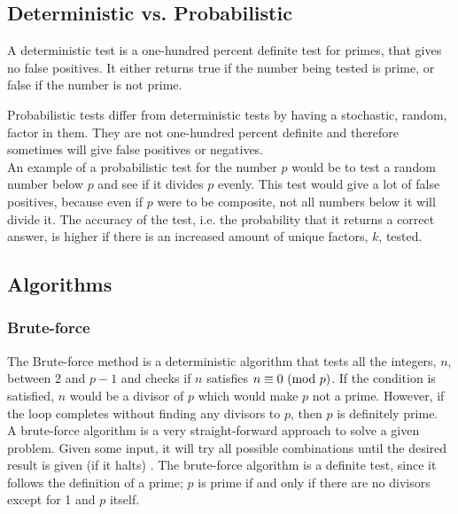 \documentclass[main.tex]{subfiles}
\begin{document}
\subsection{Deterministic vs. Probabilistic}
A deterministic test is a one-hundred percent definite test for primes, that
gives no false positives. It either returns true if the number being tested is
prime, or false if the number is not prime. \newline

Probabilistic tests differ from deterministic tests by having a stochastic,
random, factor in them. They are not one-hundred percent definite and therefore
sometimes will give false positives or negatives. \\

An example of a probabilistic test for the number $p$ would be to test a random
number below $p$ and see if it divides $p$ evenly. This test would give a lot of
false positives, because even if $p$ were to be composite, not all numbers below
it will divide it. The accuracy of the test, i.e. the probability that it
returns a correct answer, is higher if there is an increased amount of unique
factors, $k$, tested.

\subsection{Algorithms}

\subsubsection{Brute-force} \label{brute}

The Brute-force method is a deterministic algorithm that tests all the integers,
$n$, between $2$ and $p-1$ and checks if $n$ satisfies $n \equiv 0 \ (\mathrm{mod}\ p)$. If
the condition is satisfied, $n$ would be a divisor of $p$ which would make $p$
not a prime. However, if the loop completes without finding any divisors to $p$,
then $p$ is definitely prime. \\

A brute-force algorithm is a very straight-forward approach to solve a given
problem. Given some input, it will try all possible combinations until the
desired result is given (if it halts) \cite{algh:brute}. The brute-force
algorithm is a definite test, since it follows the definition of a prime; $p$ is
prime if and only if there are no divisors except for 1 and $p$ itself. \\
\end{document}
